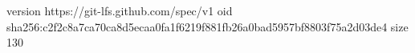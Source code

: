 version https://git-lfs.github.com/spec/v1
oid sha256:c2f2c8a7ca70ca8d5ecaa0fa1f6219f881fb26a0bad5957bf8803f75a2d03de4
size 130
